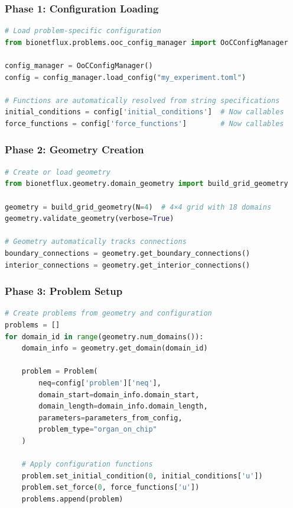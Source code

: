 \subsubsection{Phase 1: Configuration Loading}

\begin{lstlisting}[language=Python, caption=Configuration Phase Example]
# Load problem-specific configuration
from bionetflux.problems.ooc_config_manager import OoCConfigManager

config_manager = OoCConfigManager()
config = config_manager.load_config("my_experiment.toml")

# Functions are automatically resolved from string specifications
initial_conditions = config['initial_conditions']  # Now callables
force_functions = config['force_functions']        # Now callables
\end{lstlisting}

\subsubsection{Phase 2: Geometry Creation}

\begin{lstlisting}[language=Python, caption=Geometry Phase Example]
# Create or load geometry
from bionetflux.geometry.domain_geometry import build_grid_geometry

geometry = build_grid_geometry(N=4)  # 4×4 grid with 18 domains
geometry.validate_geometry(verbose=True)

# Geometry automatically tracks connections
boundary_connections = geometry.get_boundary_connections()
interior_connections = geometry.get_interior_connections()
\end{lstlisting}

\subsubsection{Phase 3: Problem Setup}

\begin{lstlisting}[language=Python, caption=Problem Setup Phase Example]
# Create problems from geometry and configuration
problems = []
for domain_id in range(geometry.num_domains()):
    domain_info = geometry.get_domain(domain_id)
    
    problem = Problem(
        neq=config['problem']['neq'],
        domain_start=domain_info.domain_start,
        domain_length=domain_info.domain_length,
        parameters=parameters_from_config,
        problem_type="organ_on_chip"
    )
    
    # Apply configuration functions
    problem.set_initial_condition(0, initial_conditions['u'])
    problem.set_force(0, force_functions['u'])
    problems.append(problem)
\end{lstlisting}

